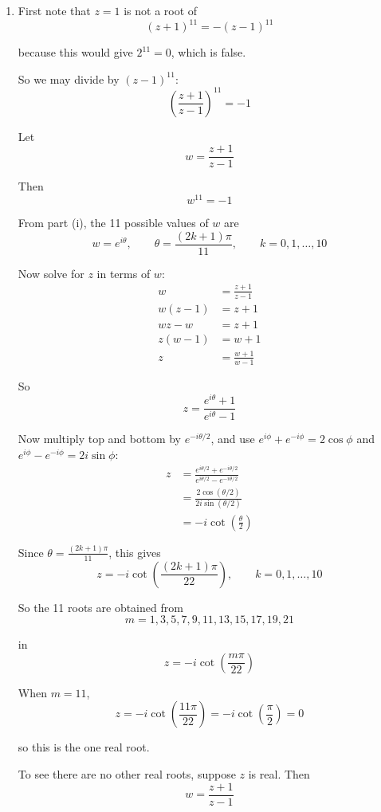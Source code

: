 \documentclass[leqno]{article}
\begin{document}
\begin{enumerate}[
  label=\textbf{\arabic*.},
  leftmargin=*,
  topsep=0pt,
  partopsep=0pt,
  parsep=0pt
]
\begin{djsSolution}
\begin{enumerate}[label=\textbf{(\roman*)}]
so the eleventh roots of $-1$ are
\[
w=e^{\frac{(2k+1)\pi}{11}i},
\qquad k=0,1,\ldots,10
\]

which are
\[
e^{\frac{\pi}{11}i},\ e^{\frac{3\pi}{11}i},\ e^{\frac{5\pi}{11}i},\ \dots,\ e^{\frac{21\pi}{11}i}
\]

\item First note that $z=1$ is not a root of
\[
(z+1)^{11}=-(z-1)^{11}
\]

because this would give $2^{11}=0$, which is false.

So we may divide by $(z-1)^{11}$:
\[
\left(\frac{z+1}{z-1}\right)^{11}=-1
\]

Let
\[
w=\frac{z+1}{z-1}
\]

Then
\[
w^{11}=-1
\]

From part (i), the 11 possible values of $w$ are
\[
w=e^{i\theta},
\qquad \theta=\frac{(2k+1)\pi}{11},
\qquad k=0,1,\ldots,10
\]

Now solve for $z$ in terms of $w$:
\begin{align*}
w&=\frac{z+1}{z-1} \\
w(z-1)&=z+1 \\
wz-w&=z+1 \\
z(w-1)&=w+1 \\
z&=\frac{w+1}{w-1}
\end{align*}

So
\[
z=\frac{e^{i\theta}+1}{e^{i\theta}-1}
\]

Now multiply top and bottom by $e^{-i\theta/2}$, and use $e^{i\phi}+e^{-i\phi}=2\cos\phi$ and $e^{i\phi}-e^{-i\phi}=2i\sin\phi$:
\begin{align*}
z&=\frac{e^{i\theta/2}+e^{-i\theta/2}}{e^{i\theta/2}-e^{-i\theta/2}} \\
&=\frac{2\cos(\theta/2)}{2i\sin(\theta/2)} \\
&=-i\cot\left(\frac{\theta}{2}\right)
\end{align*}

Since $\theta=\frac{(2k+1)\pi}{11}$, this gives
\[
z=-i\cot\left(\frac{(2k+1)\pi}{22}\right),
\qquad k=0,1,\ldots,10
\]

So the 11 roots are obtained from
\[
m=1,3,5,7,9,11,13,15,17,19,21
\]

in
\[
z=-i\cot\left(\frac{m\pi}{22}\right)
\]

When $m=11$,
\[
z=-i\cot\left(\frac{11\pi}{22}\right)
=-i\cot\left(\frac{\pi}{2}\right)=0
\]

so this is the one real root.

To see there are no other real roots, suppose $z$ is real. Then
\[
w=\frac{z+1}{z-1}
\]


\end{enumerate}
\end{djsSolution}
\end{enumerate}
\end{document}
